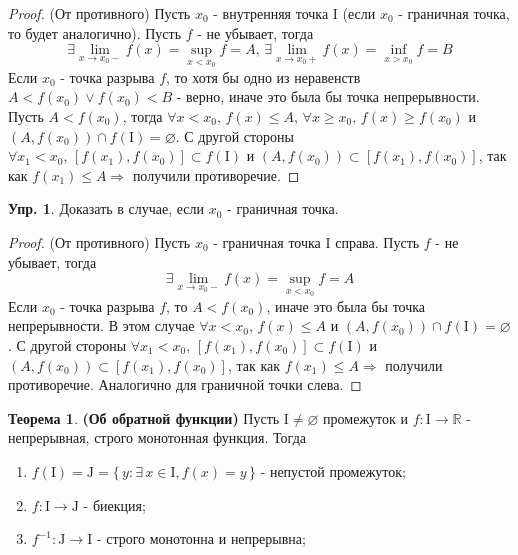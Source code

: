 \documentclass[12pt]{article}
\newcommand{\MR}{\mathbb{R}}
\newcommand{\MI}{\mathrm{I}}
\newcommand{\MJ}{\mathrm{J}}
\newcommand{\VN}{\varnothing}
\theoremstyle{definition}
\newtheorem{exrc}{Упр.}
\newtheorem{theorem}{Теорема}
\begin{document}
\begin{proof}
	(От противного) Пусть $x_0$ - внутренняя точка $\MI$ (если $x_0$ - граничная точка, то будет аналогично). Пусть $f$ - не убывает, тогда 
	$$\exists \! \lim\limits_{x \to x_0-}f(x) = \sup\limits_{x < x_0}{f} = A, \, \exists \! \lim\limits_{x \to x_0+}f(x) = \inf\limits_{x > x_0}{f} = B$$
	Если $x_0$ - точка разрыва $f$, то хотя бы одно из неравенств $A < f(x_0) \vee f(x_0) < B$ - верно, иначе это была бы точка непрерывности. Пусть $A < f(x_0)$, тогда $\forall x < x_0, \, f(x) \leq A, \, \forall x \geq x_0, \, f(x) \geq f(x_0)$ и $(A, f(x_0)) \cap f(\MI) = \VN$. С другой стороны $\forall x_1 < x_0, \, [f(x_1), f(x_0)] \subset f(\MI)$ и $(A, f(x_0)) \subset [f(x_1),f(x_0)]$, так как $f(x_1) \leq A \Rightarrow$ получили противоречие.	
\end{proof}

\begin{exrc}
	Доказать в случае, если $x_0$ - граничная точка.
\end{exrc}
\begin{proof}
	(От противного) Пусть $x_0$ - граничная точка $\MI$ справа. Пусть $f$ - не убывает, тогда 
	$$\exists \! \lim\limits_{x \to x_0-}f(x) = \sup\limits_{x < x_0}{f} = A$$
	Если $x_0$ - точка разрыва $f$, то $A < f(x_0)$, иначе это была бы точка непрерывности. В этом случае $\forall x < x_0, \, f(x) \leq A$ и $(A, f(x_0)) \cap f(\MI) = \VN$. С другой стороны $\forall x_1 < x_0, \, [f(x_1), f(x_0)] \subset f(\MI)$ и $(A, f(x_0)) \subset [f(x_1),f(x_0)]$, так как $f(x_1) \leq A \Rightarrow$ получили противоречие. Аналогично для граничной точки слева.
\end{proof}

\begin{theorem}\textbf{(Об обратной функции)}
	Пусть $\MI \neq \VN$ промежуток и $f \colon \MI \to \MR$ - непрерывная, строго монотонная функция. Тогда 
	\begin{enumerate}[label={\arabic*)}]
		\item $f(\MI) = \MJ = \{\, y \colon \exists \, x \in \MI, f(x) = y \,\}$ - непустой промежуток;
		\item $f\colon \MI \to \MJ$ - биекция;
		\item $f^{-1} \colon \MJ \to \MI$ - строго монотонна и непрерывна;
	\end{enumerate}
\end{theorem}
\end{document}
